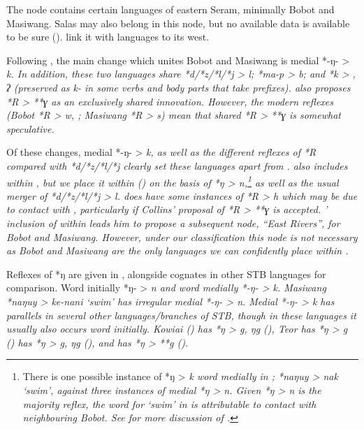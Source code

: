 \newpage
{}
The  node contains certain languages of eastern
Seram, minimally Bobot and Masiwang.
Salas may also belong in this node,
but no available data is available to be sure ().
\citet{LoskiLoski1989} link it
with  languages to its west.

Following \citet{Collins1986}, the main change which unites Bobot
and Masiwang is medial *-ŋ- > \it{k}.
In addition, these two languages share *d/*z/*l/*j > \it{l};
*ma-p > \it{b}; and *k > {\0},
\it{ʔ} (preserved as \it{k-} in some verbs
and body parts that take prefixes).
\citet{Collins1986} also proposes *R > **ɣ as an exclusively shared innovation.
However, the modern reflexes (Bobot *R > \it{w}, {\0}; Masiwang
*R > \it{s}) mean that shared *R > **ɣ is somewhat speculative.

Of these changes, medial *-ŋ- > \it{k},
as well as the different reflexes of *R compared with *d/*z/*l/*j
clearly set these languages apart from .
\citet{Collins1986} also includes  within ,
but we place it within  () on
the basis of  *ŋ > \it{n},\footnote{
		There is one possible instance
		of *ŋ > \it{k} word medially in ; *naŋuy > \it{nak} ‘swim’,
		against three instances of medial *ŋ > \it{n}.
		Given *ŋ > \it{n} is the majority reflex, the word for ‘swim’
		in  is attributable to contact with neighbouring Bobot.
		See  for more discussion of .}
as well as the usual merger of *d/*z/*l/*j > \it{l}.
 does have some instances of *R > \it{h} which may
be due to contact with ,
particularly if Collins’ proposal of *R > **ɣ is accepted.
\citeauthor{Collins1986}’ inclusion of  within 
leads him to propose a subsequent node,
“East Rivers”, for Bobot and Masiwang.
However, under our classification this node is not necessary
as Bobot and Masiwang are the only languages
we can confidently place within .

Reflexes of *ŋ are given in ,
alongside cognates in other STB languages for comparison.
Word initially *ŋ- > \it{n}
and word medially *-ŋ- > \it{k}.
Masiwang *naŋuy > \it{ke-nani} ‘swim’ has irregular medial *-ŋ- > \it{n}.
Medial *-ŋ- > \it{k} has parallels in several other languages/branches
of STB, though in these languages it usually also occurs word initially.
Kowiai () has *ŋ > \it{g, ŋg} (),
Teor has *ŋ > \it{g} ()
 has *ŋ > \it{g, ŋg} (), and
 has *ŋ > **g ().

